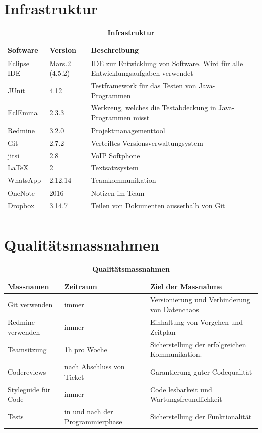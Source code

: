 \documentclass[a4,12pt]{scrartcl}
\begin{document}
\section{Infrastruktur}
\begin{table}[H]
\centering
    \begin{tabular}{@{} l l p{9cm} @{}}\toprule    
    {Software} & {Version} & {Beschreibung}\\ \midrule
    Eclipse IDE & Mars.2 (4.5.2) & IDE zur Entwicklung von Software. Wird für alle Entwicklungsaufgaben verwendet\\ \addlinespace
    JUnit & 4.12 & Testframework für das Testen von Java-Programmen \\ \addlinespace
    EclEmma & 2.3.3 & Werkzeug, welches die Testabdeckung in Java-Programmen misst \\ \addlinespace
    Redmine & 3.2.0 & Projektmanagementtool\\ \addlinespace
    Git & 2.7.2 & Verteiltes Versionsverwaltungsystem \\ \addlinespace
    jitsi & 2.8 & VoIP Softphone \\ \addlinespace
    \LaTeX & 2 & Textsatzsystem \\ \addlinespace
    WhatsApp & 2.12.14 & Teamkommunikation \\ \addlinespace
    OneNote & 2016 & Notizen im Team \\ \addlinespace
    Dropbox & 3.14.7 & Teilen von Dokumenten ausserhalb von Git \\ \addlinespace
    \bottomrule
    \end{tabular}
\caption{\textbf{Infrastruktur}}
\end{table}


\section{Qualitätsmassnahmen}

\begin{table}[H]
\centering
    \begin{tabular}{@{} p{3cm} p{4cm} p{6cm} @{}}\toprule    
    {Massnamen} & {Zeitraum} & {Ziel der Massnahme}\\ \midrule
    Git verwenden & immer & Versionierung und Verhinderung von Datenchaos\\ \addlinespace
    Redmine verwenden & immer & Einhaltung von Vorgehen und Zeitplan\\ \addlinespace
    Teamsitzung & 1h pro Woche & Sicherstellung der erfolgreichen Kommunikation.\\ \addlinespace
    Codereviews & nach Abschluss von Ticket & Garantierung guter Codequalität  \\ \addlinespace
    Styleguide für Code & immer & Code lesbarkeit und Wartungsfreundlichkeit\\ \addlinespace
    Tests & in und nach der Programmierphase & Sicherstellung der Funktionalität \\
    \bottomrule
    \end{tabular}
\caption{\textbf{Qualitätsmassnahmen}}
\end{table}
\end{document}
